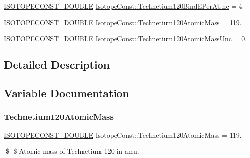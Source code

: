 \begin{DoxyCompactItemize}
\mbox{\hyperlink{group___isotope_const-_macros_ga8f45a7272ce02c0b4c65c44636ed719a}{I\+S\+O\+T\+O\+P\+E\+C\+O\+N\+S\+T\+\_\+\+D\+O\+U\+B\+LE}} \mbox{\hyperlink{group___isotope_const-_technetium-_tc120_gaed991d09306cad526c3f78475321e6fb}{Isotope\+Const\+::\+Technetium120\+Bind\+E\+Per\+A\+Unc}} = 4
\item 
\mbox{\hyperlink{group___isotope_const-_macros_ga8f45a7272ce02c0b4c65c44636ed719a}{I\+S\+O\+T\+O\+P\+E\+C\+O\+N\+S\+T\+\_\+\+D\+O\+U\+B\+LE}} \mbox{\hyperlink{group___isotope_const-_technetium-_tc120_gab19f627b7d6c898af158aedfd45661f9}{Isotope\+Const\+::\+Technetium120\+Atomic\+Mass}} = 119.
\item 
\mbox{\hyperlink{group___isotope_const-_macros_ga8f45a7272ce02c0b4c65c44636ed719a}{I\+S\+O\+T\+O\+P\+E\+C\+O\+N\+S\+T\+\_\+\+D\+O\+U\+B\+LE}} \mbox{\hyperlink{group___isotope_const-_technetium-_tc120_gac2b36ef5e33f567423dbd92b718c72ae}{Isotope\+Const\+::\+Technetium120\+Atomic\+Mass\+Unc}} = 0.
\end{DoxyCompactItemize}


\subsection{Detailed Description}


\subsection{Variable Documentation}
\mbox{\label{group___isotope_const-_technetium-_tc120_gab19f627b7d6c898af158aedfd45661f9}} 
\subsubsection{\texorpdfstring{Technetium120\+Atomic\+Mass}{Technetium120AtomicMass}}
{\footnotesize\ttfamily \mbox{\hyperlink{group___isotope_const-_macros_ga8f45a7272ce02c0b4c65c44636ed719a}{I\+S\+O\+T\+O\+P\+E\+C\+O\+N\+S\+T\+\_\+\+D\+O\+U\+B\+LE}} Isotope\+Const\+::\+Technetium120\+Atomic\+Mass = 119.}

\$ \$ Atomic mass of Technetium-\/120 in amu. \mbox{\label{group___isotope_const-_technetium-_tc120_gac2b36ef5e33f567423dbd92b718c72ae}} 
